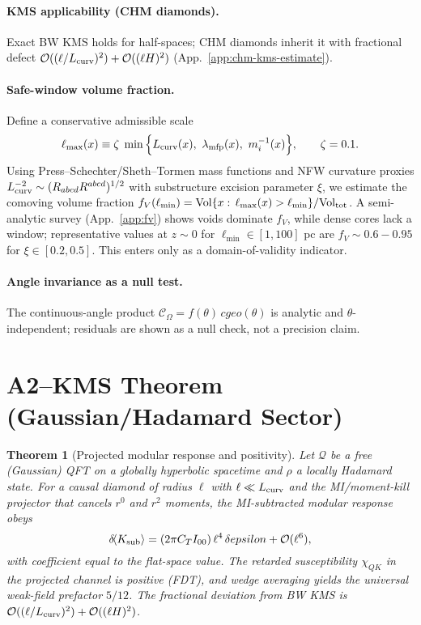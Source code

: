 \documentclass[aps,prd,onecolumn,superscriptaddress,nofootinbib]{revtex4-2}
\def\cgeo{cgeo}%
\def\eps{epsilon}%
\def\Omega_\Lambda{OmegaLambda}%
\providecommand{\cgeo}{c_{\rm geo}}
\providecommand{\eps}{\varepsilon}
\providecommand{\be}{\begin{equation}}
\providecommand{\ee}{\end{equation}}
\newtheorem{theorem}{Theorem}
\begin{document}
\paragraph{KMS applicability (CHM diamonds).} Exact BW KMS holds for half-spaces; CHM diamonds inherit it with fractional defect \(\mathcal O((\ell/L_{\rm curv})^2)+\mathcal O((\ell H)^2)\) (App.~\ref{app:chm-kms-estimate}).

\paragraph{Safe-window volume fraction.} Define a conservative admissible scale
\be
\label{eq:lmax}
\ell_{\max}(x)\equiv \zeta\;\min\Big\{L_{\rm curv}(x),\ \lambda_{\rm mfp}(x),\ m_i^{-1}(x)\Big\},\qquad \zeta=0.1.
\ee
Using Press--Schechter/Sheth--Tormen mass functions and NFW curvature proxies \(L_{\rm curv}^{-2}\sim (R_{abcd}R^{abcd})^{1/2}\) with substructure excision parameter \(\xi\), we estimate the comoving volume fraction \(f_V(\ell_{\min})=\mathrm{Vol}\{x:\,\ell_{\max}(x)>\ell_{\min}\}/\mathrm{Vol}_{\rm tot}\). A semi-analytic survey (App.~\ref{app:fv}) shows voids dominate \(f_V\), while dense cores lack a window; representative values at \(z\!\sim\!0\) for \(\ell_{\min}\in[1,100]\) pc are \(f_V\sim 0.6{-}0.95\) for \(\xi\in[0.2,0.5]\). This enters only as a domain-of-validity indicator.

\paragraph{Angle invariance as a null test.} The continuous-angle product \(\mathcal C_\Omega=f(\theta)\,\cgeo(\theta)\) is analytic and \(\theta\)-independent; residuals are shown as a null check, not a precision claim.

\section{A2–KMS Theorem (Gaussian/Hadamard Sector)}
\label{sec:theorem}

\begin{theorem}[Projected modular response and positivity]\label{thm:proj-modresp}
Let \(\mathcal Q\) be a free (Gaussian) QFT on a globally hyperbolic spacetime and \(\rho\) a locally Hadamard state. For a causal diamond of radius \(\ell\) with \(\ell\ll L_{\rm curv}\) and the MI/moment-kill projector that cancels \(r^0\) and \(r^2\) moments, the MI-subtracted modular response obeys
\be
\delta\!\langle K_{\rm sub}\rangle=(2\pi C_T I_{00})\,\ell^4\,\delta\eps+\mathcal O(\ell^6),
\ee
with coefficient equal to the flat-space value. The retarded susceptibility \(\chi_{QK}\) in the projected channel is positive (FDT), and wedge averaging yields the universal weak-field prefactor \(5/12\). The fractional deviation from BW KMS is \(\mathcal O((\ell/L_{\rm curv})^2)+\mathcal O((\ell H)^2)\).
\end{theorem}
\end{document}
